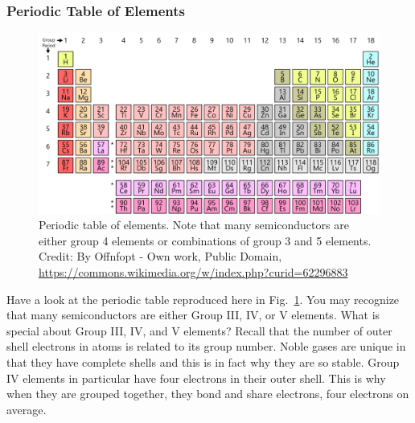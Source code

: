 \subsubsection{Periodic Table of Elements}
\begin{figure}
\centering
\includegraphics[width=\columnwidth]{periodic_table}
\caption{Periodic table of elements.  Note that many semiconductors are either group 4 elements or combinations of group 3 and 5 elements. Credit:  By Offnfopt - Own work, Public Domain, \url{https://commons.wikimedia.org/w/index.php?curid=62296883}}
\label{fig:periodic_table}
\end{figure}
Have a look at the periodic table reproduced here in Fig.~\ref{fig:periodic_table}.  You may recognize that many semiconductors are either Group III, IV, or V elements.  What is special about Group III, IV, and V elements?  Recall that the number of outer shell electrons in atoms is related to its group number.  Noble gases are unique in that they have complete shells and this is in fact why they are so stable.  Group IV elements in particular have four electrons in their outer shell.  This is why when they are grouped together, they bond and share electrons, four electrons on average.
